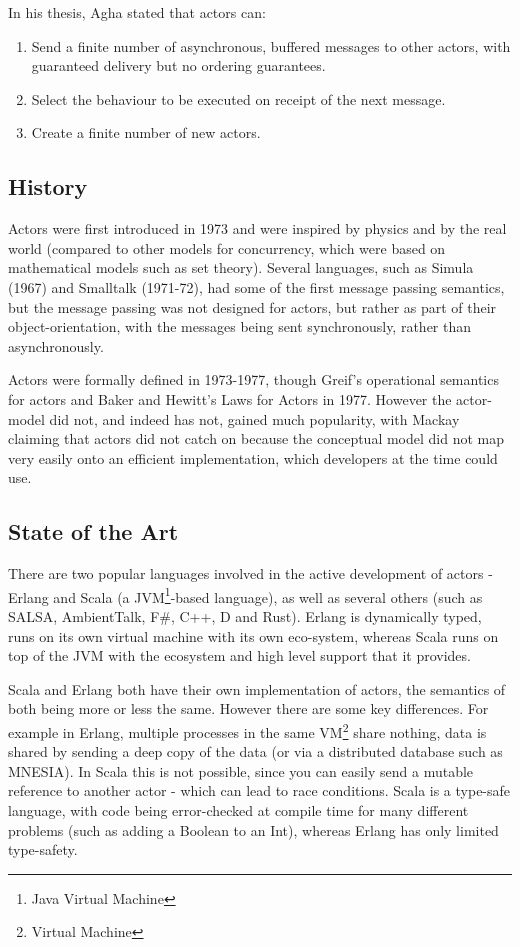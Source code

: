 \documentclass[11pt,a4paper]{report}
\begin{document}
In his thesis, Agha\cite{agha1985} stated that actors can:
\begin{enumerate}[noitemsep]
	\item Send a finite number of asynchronous, buffered messages to other actors, with guaranteed delivery but no ordering guarantees.
	\item Select the behaviour to be executed on receipt of the next message.
	\item Create a finite number of new actors.
\end{enumerate}

\subsection{History}

Actors were first introduced in 1973\cite{hewitt1973} and were inspired by physics and by the real world\cite{hewitt2006} (compared to other models for concurrency, which were based on mathematical models such as set theory\cite{Milner:1993:EIT:151233.151240}).
Several languages, such as Simula (1967) and Smalltalk (1971-72), had some of the first message passing semantics, but the message passing was not designed for actors, but rather as part of their object-orientation, with the messages being sent synchronously, rather than asynchronously.

Actors were formally defined in 1973-1977, though Greif's operational semantics for actors\cite{grief1975} and Baker and Hewitt's Laws for Actors in 1977\cite{hewitt1977}.
However the actor-model did not, and indeed has not, gained much popularity, with Mackay\cite{mackay97} claiming that actors did not catch on because the conceptual model did not map very easily onto an efficient implementation, which developers at the time could use.

\subsection{State of the Art}

There are two popular languages involved in the active development of actors - Erlang and Scala (a JVM\footnote{Java Virtual Machine}-based language), as well as several others (such as SALSA, AmbientTalk, F\#, C++, D and Rust).
Erlang is dynamically typed, runs on its own virtual machine with its own eco-system, whereas Scala runs on top of the JVM with the ecosystem and high level support that it provides.

Scala and Erlang both have their own implementation of actors, the semantics of both being more or less the same.
However there are some key differences.
For example in Erlang, multiple processes in the same VM\footnote{Virtual Machine} share nothing, data is shared by sending a deep copy of the data (or via a distributed database such as MNESIA\cite{mnesia}).
In Scala this is not possible, since you can easily send a mutable reference to another actor - which can lead to race conditions\cite{akka-mutable}.
Scala is a type-safe language, with code being error-checked at compile time for many different problems (such as adding a Boolean to an Int), whereas Erlang has only limited type-safety.
\end{document}
